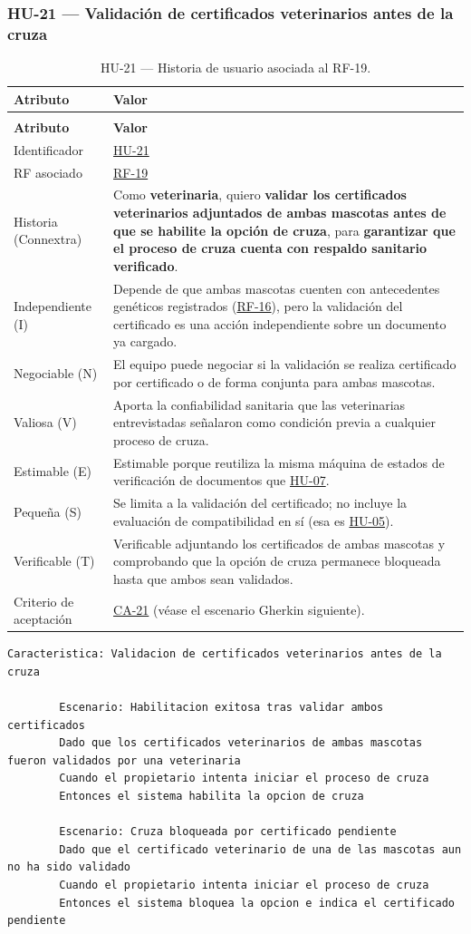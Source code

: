 \documentclass[journal,onecolumn]{IEEEtran}
\makeatletter
\newenvironment{atributos}[2]{%
	\small
	\begin{longtable}{@{}>{\raggedright\arraybackslash}p{4.2cm} >{\raggedright\arraybackslash}p{11.2cm}@{}}
		\caption{#2}\label{tab:#1}\\
		\toprule
		\textbf{Atributo} & \textbf{Valor} \\
		\midrule
		\endfirsthead
		\multicolumn{2}{@{}l}{\small\itshape (continuación)}\\
		\toprule
		\textbf{Atributo} & \textbf{Valor} \\
		\midrule
		\endhead
		\bottomrule
		\endlastfoot
	}{%
	\end{longtable}
	\normalsize
}
\makeatother
\begin{document}
	\subsubsection{HU-21 --- Validación de certificados veterinarios antes de la cruza}
	
	\begin{atributos}{HU-21}{HU-21 --- Historia de usuario asociada al RF-19.}
		Identificador & \hyperref[tab:HU-21]{HU-21} \\
		RF asociado & \hyperref[tab:RF-19]{RF-19} \\
		Historia (Connextra) & Como \textbf{veterinaria}, quiero \textbf{validar los certificados veterinarios adjuntados de ambas mascotas antes de que se habilite la opción de cruza}, para \textbf{garantizar que el proceso de cruza cuenta con respaldo sanitario verificado}. \\
		Independiente (I) & Depende de que ambas mascotas cuenten con antecedentes genéticos registrados (\hyperref[tab:RF-16]{RF-16}), pero la validación del certificado es una acción independiente sobre un documento ya cargado. \\
		Negociable (N) & El equipo puede negociar si la validación se realiza certificado por certificado o de forma conjunta para ambas mascotas. \\
		Valiosa (V) & Aporta la confiabilidad sanitaria que las veterinarias entrevistadas señalaron como condición previa a cualquier proceso de cruza. \\
		Estimable (E) & Estimable porque reutiliza la misma máquina de estados de verificación de documentos que \hyperref[tab:HU-07]{HU-07}. \\
		Pequeña (S) & Se limita a la validación del certificado; no incluye la evaluación de compatibilidad en sí (esa es \hyperref[tab:HU-05]{HU-05}). \\
		Verificable (T) & Verificable adjuntando los certificados de ambas mascotas y comprobando que la opción de cruza permanece bloqueada hasta que ambos sean validados. \\
		Criterio de aceptación & \hyperref[lst:ca21]{CA-21} (véase el escenario Gherkin siguiente). \\
	\end{atributos}
	
	\begin{lstlisting}[style=gherkin,caption={CA-21 --- Escenario de aceptación de la historia HU-21.},label={lst:ca21}]
		Caracteristica: Validacion de certificados veterinarios antes de la cruza
		
		Escenario: Habilitacion exitosa tras validar ambos certificados
		Dado que los certificados veterinarios de ambas mascotas fueron validados por una veterinaria
		Cuando el propietario intenta iniciar el proceso de cruza
		Entonces el sistema habilita la opcion de cruza
		
		Escenario: Cruza bloqueada por certificado pendiente
		Dado que el certificado veterinario de una de las mascotas aun no ha sido validado
		Cuando el propietario intenta iniciar el proceso de cruza
		Entonces el sistema bloquea la opcion e indica el certificado pendiente
	\end{lstlisting}
	
\end{document}
